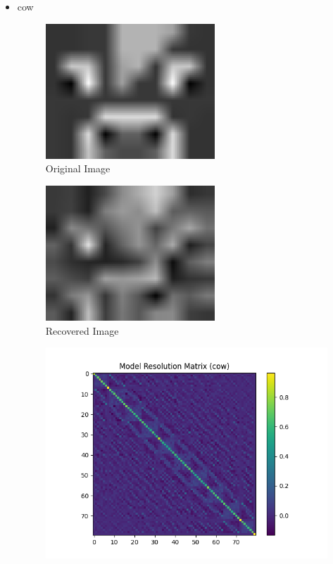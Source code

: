 \documentclass{article}
\begin{document}
\begin{itemize}
    \item cow
\begin{figure}[h]
    \centering
    \includegraphics[width=0.6\textwidth]{images/greyscale/cow.png}
    \caption{Original Image}
\end{figure}
\begin{figure}[h]
    \centering
    \includegraphics[width=0.6\textwidth]{images/outputs/cow.png}
    \caption{Recovered Image}
\end{figure}
\begin{figure}[h]
    \centering
    \includegraphics[width=1\textwidth]{images/outputs/modelres/cow.png}

\end{figure}
\end{itemize}
\end{document}
